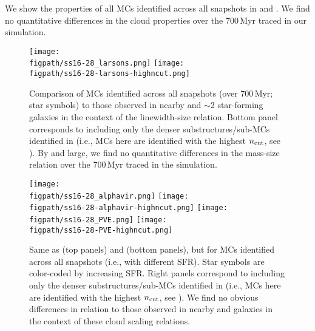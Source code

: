 \IfFileExists{emulateapjlegacy.cls}{\documentclass[iop]{emulateapjlegacy}}{\documentclass[iop]{emulateapj}}
\begin{document}
We show the properties of all MCs identified across all snapshots
in  and .
We find no quantitative differences in the cloud properties over the 700\,Myr traced in our simulation.



\begin{figure*}[htbp]
\centering
\texttt{[image: \\figpath/ss16-28\_larsons.png]}
\texttt{[image: \\figpath/ss16-28-larsons-highncut.png]}
\caption{
Comparison of MCs identified across all snapshots (over 700\,Myr; star symbols)
to those observed in nearby and \z$\sim$2 star-forming galaxies
in the context of the linewidth-size relation.
Bottom panel corresponds to including only the denser substructures/sub-MCs identified in \flower
(i.e., MCs here are identified with the highest $n_{\rm cut}$, see ).
By and large, we find no quantitative differences in the mass-size relation over the 700\,Myr traced in the simulation.
\label{fig:larsons16-28}}
\end{figure*}

\begin{figure*}[htbp]
\centering
\texttt{[image: \\figpath/ss16-28\_alphavir.png]}
\texttt{[image: \\figpath/ss16-28-alphavir-highncut.png]}
\texttt{[image: \\figpath/ss16-28\_PVE.png]}
\texttt{[image: \\figpath/ss16-28-PVE-highncut.png]}
\caption{
Same as  (top panels) and  (bottom panels), but for MCs identified across all snapshots 
(i.e., with different SFR). Star symbols are color-coded by increasing SFR.
Right panels correspond to including only the denser substructures/sub-MCs identified in \flower
(i.e., MCs here are identified with the highest $n_{\rm cut}$, see ).
We find no obvious differences in relation to those observed in nearby and \highz 
galaxies in the context of these cloud scaling relations.
\label{fig:alpha16-28}}
\end{figure*}
\end{document}
